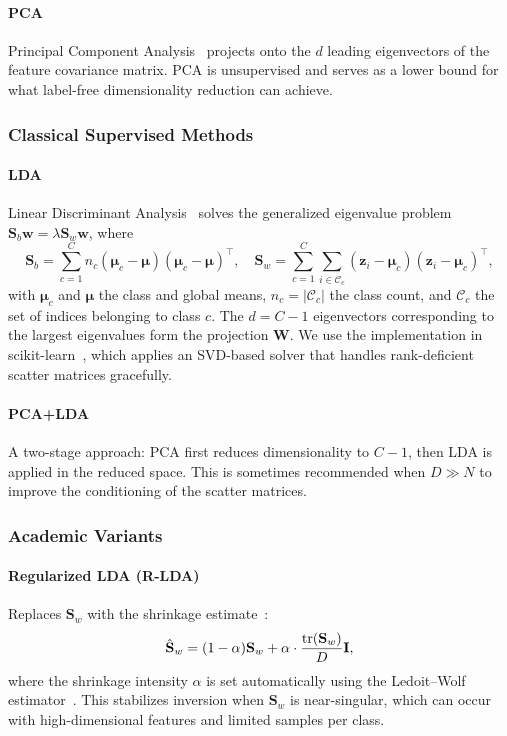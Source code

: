 \paragraph{PCA} Principal Component Analysis~\cite{pearson1901pca} projects onto the $d$ leading eigenvectors of the feature covariance matrix. PCA is unsupervised and serves as a lower bound for what label-free dimensionality reduction can achieve.

\subsubsection{Classical Supervised Methods}

\paragraph{LDA} Linear Discriminant Analysis~\cite{fisher1936lda} solves the generalized eigenvalue problem $\mathbf{S}_b\mathbf{w} = \lambda\mathbf{S}_w\mathbf{w}$, where
\begin{equation}
\mathbf{S}_b = \sum_{c=1}^{C} n_c(\boldsymbol{\mu}_c - \boldsymbol{\mu})(\boldsymbol{\mu}_c - \boldsymbol{\mu})^\top, \quad
\mathbf{S}_w = \sum_{c=1}^{C}\sum_{i \in \mathcal{C}_c} (\mathbf{z}_i - \boldsymbol{\mu}_c)(\mathbf{z}_i - \boldsymbol{\mu}_c)^\top,
\end{equation}
with $\boldsymbol{\mu}_c$ and $\boldsymbol{\mu}$ the class and global means, $n_c = |\mathcal{C}_c|$ the class count, and $\mathcal{C}_c$ the set of indices belonging to class $c$. The $d = C - 1$ eigenvectors corresponding to the largest eigenvalues form the projection $\mathbf{W}$. We use the implementation in scikit-learn~\cite{sklearn}, which applies an SVD-based solver that handles rank-deficient scatter matrices gracefully.

\paragraph{PCA+LDA} A two-stage approach: PCA first reduces dimensionality to $C - 1$, then LDA is applied in the reduced space. This is sometimes recommended when $D \gg N$ to improve the conditioning of the scatter matrices.

\subsubsection{Academic Variants}

\paragraph{Regularized LDA (R-LDA)} Replaces $\mathbf{S}_w$ with the shrinkage estimate~\cite{friedman1989regularized}:
\begin{equation}
\hat{\mathbf{S}}_w = (1 - \alpha)\mathbf{S}_w + \alpha \cdot \frac{\operatorname{tr}(\mathbf{S}_w)}{D}\mathbf{I},
\end{equation}
where the shrinkage intensity $\alpha$ is set automatically using the Ledoit--Wolf estimator~\cite{ledoit2004well}. This stabilizes inversion when $\mathbf{S}_w$ is near-singular, which can occur with high-dimensional features and limited samples per class.

